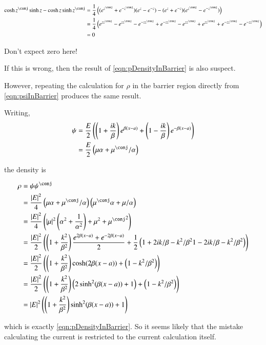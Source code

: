 \documentclass{article}
\begin{document}
\begin{align*}
\cosh z^\conj \sinh z - \cosh z \sinh z^\conj
&=
\inv{4} \left(
( e^{z^\conj} + e^{-z^\conj}) ( e^{z} - e^{-z}) 
- ( e^{z} + e^{-z}) ( e^{z^\conj} - e^{-z^\conj}) 
\right)
\\
&=
\inv{4} \left(
e^{z z^\conj} 
-e^{z z^\conj} 
-e^{-z z^\conj} 
+e^{-z z^\conj} 
- e^{z z^\conj}
+ e^{z z^\conj}
+ e^{-z z^\conj}
- e^{-z z^\conj} 
\right)
\\
&= 0
\end{align*}

Don't expect zero here!

If this is wrong, then the result of \ref{eqn:pDensityInBarrier} is also suspect.

However, repeating the calculation for $\rho$ in the barrier region directly from \ref{eqn:psiInBarrier} produces the same result.

Writing, 
\begin{align*}
\psi &=
\frac{E}{2}\left( \left( 1 + \frac{i k}{\beta} \right) e^{ \beta(x-a)} + \left( 1 - \frac{i k}{\beta} \right) e^{ -\beta(x-a)} \right) \\
&=
\frac{E}{2}\left( \mu \alpha + \mu^\conj/\alpha \right)
\end{align*}

the density is

\begin{align*}
\rho 
&=
\psi\psi^\conj \\
&=
\frac{\Abs{E}^2}{4}
\left( \mu \alpha + \mu^\conj/\alpha \right) \left( \mu^\conj \alpha + \mu/\alpha \right) \\
&=
\frac{\Abs{E}^2}{4}
\left( 
\Abs{\mu}^2\left( \alpha^2 + \inv{\alpha^2}\right) 
+ \mu^2
+ {\mu^\conj}^2
\right) \\
&=
\frac{\Abs{E}^2}{2}
\left( 
\left( 1 + \frac{k^2}{\beta^2} \right)\frac{ 
e^{2\beta(x-a)}
+e^{-2\beta(x-a)}
}{2}
+ \inv{2}\left( 
1 + 2 i k/\beta - k^2/\beta^2
1 - 2 i k/\beta - k^2/\beta^2
\right)
\right) \\
&=
\frac{\Abs{E}^2}{2}
\left( 
\left( 1 + \frac{k^2}{\beta^2} \right) \cosh(2\beta(x-a))
+ \left( 
1 - k^2/\beta^2
\right)
\right) \\
&=
\frac{\Abs{E}^2}{2}
\left( 
\left( 1 + \frac{k^2}{\beta^2} \right) \left( 2 \sinh^2(\beta(x-a)) + 1 \right)
+ \left( 
1 - k^2/\beta^2
\right)
\right) \\
&=
\Abs{E}^2
\left( 
\left( 1 + \frac{k^2}{\beta^2} \right) \sinh^2(\beta(x-a)) 
+1 
\right) \\
\end{align*}

which is exactly \ref{eqn:pDensityInBarrier}.  So it seems likely that the mistake calculating the current is restricted to the
current calculation itself.



\end{document}
